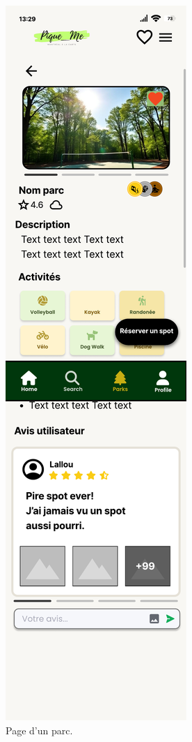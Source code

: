 \documentclass[12pt,a4paper]{article}
\begin{document}
\begin{figure}[h!]
  \centering
  \includegraphics[width=0.9\linewidth]{attachments/pageParc.pdf}
  \caption{Page d'un parc.}
\end{figure}
\end{document}
